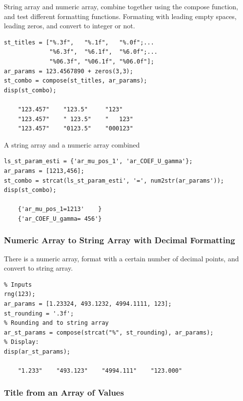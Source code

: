 \documentclass[
]{book}
\begin{document}
String array and numeric array, combine together using the compose
function, and test different formatting functions. Formating with
leading empty spaces, leading zeros, and convert to integer or not.

\begin{verbatim}
st_titles = ["%.3f",   "%.1f",   "%.0f";...
             "%6.3f",  "%6.1f",  "%6.0f";...
             "%06.3f", "%06.1f", "%06.0f"];
ar_params = 123.4567890 + zeros(3,3);
st_combo = compose(st_titles, ar_params);
disp(st_combo);

    "123.457"    "123.5"     "123"   
    "123.457"    " 123.5"    "   123"
    "123.457"    "0123.5"    "000123"
\end{verbatim}

A string array and a numeric array combined

\begin{verbatim}
ls_st_param_esti = {'ar_mu_pos_1', 'ar_COEF_U_gamma'};
ar_params = [1213,456];
st_combo = strcat(ls_st_param_esti', '=', num2str(ar_params'));
disp(st_combo);

    {'ar_mu_pos_1=1213'    }
    {'ar_COEF_U_gamma= 456'}
\end{verbatim}

\hypertarget{numeric-array-to-string-array-with-decimal-formatting}{%
\subsubsection{Numeric Array to String Array with Decimal Formatting}\label{numeric-array-to-string-array-with-decimal-formatting}}

There is a numeric array, format with a certain number of decimal
points, and convert to string array.

\begin{verbatim}
% Inputs
rng(123);
ar_params = [1.23324, 493.1232, 4994.1111, 123];
st_rounding = '.3f';
% Rounding and to string array
ar_st_params = compose(strcat("%", st_rounding), ar_params);
% Display:
disp(ar_st_params);

    "1.233"    "493.123"    "4994.111"    "123.000"
\end{verbatim}

\hypertarget{title-from-an-array-of-values}{%
\subsubsection{Title from an Array of Values}\label{title-from-an-array-of-values}}
\end{document}
